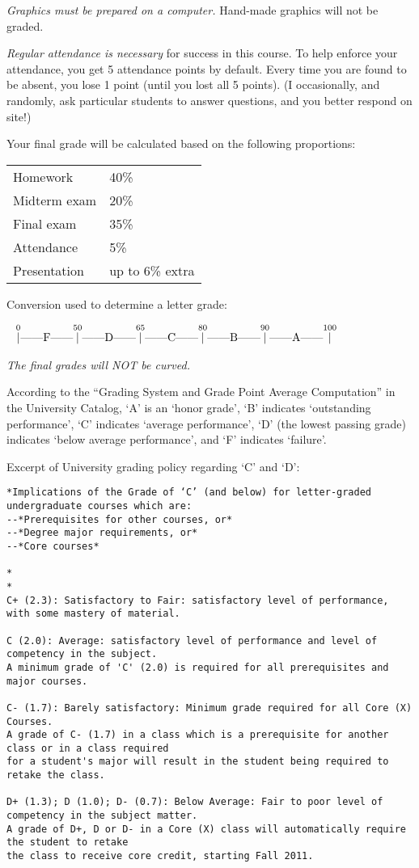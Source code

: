 \documentclass{article}
\begin{document}
\emph{Graphics must be prepared on a computer.}
Hand-made graphics will not be graded.

\emph{Regular attendance is necessary} for success in this course.
To help enforce your attendance,
you get 5 attendance points by default.
Every time you are found to be absent, you lose 1 point (until you lost
all 5 points).
(I occasionally, and randomly, ask particular students to answer
questions, and you better respond on site!)

Your final grade will be calculated based on the following proportions:


\hskip2cm
\begin{tabular}{ll}
Homework        & 40\%\\
Midterm exam   & 20\%\\
Final exam      & 35\%\\
Attendance      & 5\%\\
Presentation    & up to 6\% extra
\end{tabular}

Conversion used to determine a letter grade:

\[
\overset{0}{|}
\text{------F------}\overset{50}{|}
\text{------D------}\overset{65}{|}
\text{------C------}\overset{80}{|}
\text{------B------}\overset{90}{|}
\text{------A------}\overset{100}{|}
\qquad\qquad\qquad\strut
\]

\emph{The final grades will NOT be curved.}

According to
the ``Grading System and Grade Point Average Computation''
in the University Catalog,
`A' is an `honor grade',
`B' indicates `outstanding performance',
`C' indicates `average performance',
`D' (the lowest passing grade) indicates `below average performance',
and
`F' indicates `failure'.

Excerpt of University grading policy regarding `C' and `D':
\begin{verbatim}
*Implications of the Grade of ‘C’ (and below) for letter-graded undergraduate courses which are:
--*Prerequisites for other courses, or*
--*Degree major requirements, or*
--*Core courses*

*
*
C+ (2.3): Satisfactory to Fair: satisfactory level of performance, with some mastery of material.

C (2.0): Average: satisfactory level of performance and level of competency in the subject.
A minimum grade of 'C' (2.0) is required for all prerequisites and major courses.

C- (1.7): Barely satisfactory: Minimum grade required for all Core (X) Courses.
A grade of C- (1.7) in a class which is a prerequisite for another class or in a class required
for a student's major will result in the student being required to retake the class.

D+ (1.3); D (1.0); D- (0.7): Below Average: Fair to poor level of competency in the subject matter.
A grade of D+, D or D- in a Core (X) class will automatically require the student to retake
the class to receive core credit, starting Fall 2011.
\end{verbatim}
\end{document}
